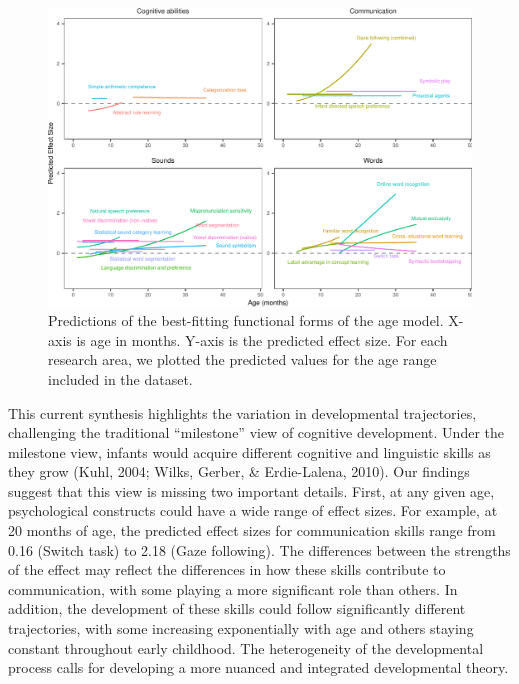 \documentclass[10pt, letterpaper]{article}
\newenvironment{CodeChunk}{}{}
\begin{document}
\begin{CodeChunk}
\begin{figure}[h!]

{\centering \includegraphics{figs/2-col-imageb-1} 

}

\caption[Predictions of the best-fitting functional forms of the age model]{Predictions of the best-fitting functional forms of the age model. X-axis is age in months. Y-axis is the predicted effect size. For each research area, we plotted the predicted values for the age range included in the dataset.}\label{fig:2-col-imageb}
\end{figure}
\end{CodeChunk}

This current synthesis highlights the variation in developmental
trajectories, challenging the traditional ``milestone'' view of
cognitive development. Under the milestone view, infants would acquire
different cognitive and linguistic skills as they grow (Kuhl, 2004;
Wilks, Gerber, \& Erdie-Lalena, 2010). Our findings suggest that this
view is missing two important details. First, at any given age,
psychological constructs could have a wide range of effect sizes. For
example, at 20 months of age, the predicted effect sizes for
communication skills range from 0.16 (Switch task) to 2.18 (Gaze
following). The differences between the strengths of the effect may
reflect the differences in how these skills contribute to communication,
with some playing a more significant role than others. In addition, the
development of these skills could follow significantly different
trajectories, with some increasing exponentially with age and others
staying constant throughout early childhood. The heterogeneity of the
developmental process calls for developing a more nuanced and integrated
developmental theory.
\end{document}
